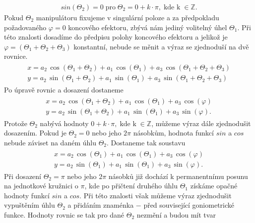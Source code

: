 \documentclass{article}
\begin{document}
				\begin{align}
					sin(\Theta_{2})=0 \; \text{pro}\; \Theta_{2} = 0 + k\cdot \pi, \;\text{kde k}\; \in \mathbb{Z}.
				\end{align}
			Pokud \(\Theta_{2}\) manipulátoru fixujeme v singulární poloze a za předpokladu požadovaného \(\varphi = 0\) koncového efektoru, zbývá nám jediný volitelný úhel \(\Theta_{1}\). Při této znalosti dosadíme do předpisu polohy koncového efektoru a jelikož je \(\varphi = \left(\Theta_{1}+\Theta_{2}+\Theta_{3}\right)\) konstantní, nebude se měnit a výraz se zjednoduší na dvě rovnice.
				\begin{align}
					\begin{array}{c}
						x = a_2 \,\cos \left(\Theta_1 +\Theta_2 \right)+a_1 \,\cos \left(\Theta_1 \right)+a_3\,\cos\left(\Theta_1 +\Theta_2 +\Theta_3 \right)\\
						y = a_2 \,\sin \left(\Theta_1 +\Theta_2 \right)+a_1 \,\sin \left(\Theta_1 \right)+a_3\,\sin\left(\Theta_1 +\Theta_2 +\Theta_3 \right)
					\end{array}
				\end{align}
			Po úpravě rovnic a dosazení dostaneme
				\begin{align}
					\begin{array}{c}
						x = a_2 \,\cos \left(\Theta_1 +\Theta_2 \right)+a_1 \,\cos \left(\Theta_1 \right)+a_3\,\cos\left(\varphi \right)\\
						y = a_2 \,\sin \left(\Theta_1 +\Theta_2 \right)+a_1 \,\sin \left(\Theta_1 \right)+a_3\,\sin\left(\varphi \right).
					\end{array}
				\end{align}
			Protože \(\Theta_{2}\) nabývá hodnoty \(0 + k\cdot \pi, \;\text{kde k}\; \in \mathbb{Z}\), můžeme výraz dále zjednodušit dosazením. Pokud je \(\Theta_{2} = 0\) nebo jeho \(2\pi\) násobkům, hodnota funkcí \(sin\) a \(cos\) nebude záviset na daném úhlu \(\Theta_{2}\). Dostaneme tak soustavu
				\begin{align}
					\begin{array}{c}
						x = a_2 \,\cos \left(\Theta_1\right)+a_1 \,\cos \left(\Theta_1 \right)+a_3\,\cos\left(\varphi \right)\\
						y = a_2 \,\sin \left(\Theta_1\right)+a_1 \,\sin \left(\Theta_1 \right)+a_3\,\sin\left(\varphi \right).
					\end{array}
				\end{align}
			Při dosazení \(\Theta_{2} = \pi\) nebo jeho \(2\pi\) násobků již dochází k permanentnímu posunu na jednotkové kružnici o \(\pi\), kde po přičtení druhého úhlu \(\Theta_{1}\) získáme opačné hodnoty funkcí \(sin\) a \(cos\). Při této znalosti však můžeme výraz zjednodušit vypuštěním úhlu \(\Theta_{2}\) a přidáním znaménka \(-\) před související goniometrické funkce. Hodnoty rovnic se tak pro dané \(\Theta_{2}\) nezmění a budou mít tvar
\end{document}
